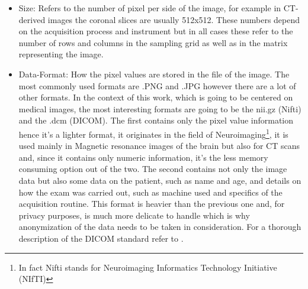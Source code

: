 \begin{itemize}
\item Size: Refers to the number of pixel per side of the image, for example in CT-derived images the coronal slices are usually 512x512. These numbers depend on the acquisition process and instrument but in all cases these refer to the number of rows and columns in the sampling grid as well as in the matrix representing the image.
\item Data-Format: How the pixel values are stored in the file of the image. The most commonly used formats are .PNG and .JPG however there are a lot of other formats. In the context of this work, which is going to be centered on medical images, the most interesting formats are going to be the nii.gz (Nifti) and the .dcm (DICOM). The first contains only the pixel value information hence it's a lighter format, it originates in the field of Neuroimaging\footnote{In fact Nifti stands for Neuroimaging Informatics Technology Initiative (NIfTI)}, it is used mainly in Magnetic resonance images of the brain but also for CT scans and, since it contains only  numeric information, it's the less memory consuming option out of the two. The second contains not only the image data but also some data on the patient, such as name and age, and details on how the exam was carried out, such as machine used and specifics of the acquisition routine. This format is heavier than the previous one and, for privacy purposes, is much more delicate to handle which is why anonymization of the data needs to be taken in consideration. For a thorough description of the DICOM standard refer to \cite{DICOM}. 
\end{itemize}

